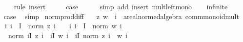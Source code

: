 \begin{isabellebody}
\ \ \ \ \isamarkupfalse%
\ {\isacharparenleft}{\kern0pt}rule\ insert{\isacharparenright}{\kern0pt}\isanewline
\ \ \isamarkupfalse%
\ \isamarkupfalse%
\ {\isacharquery}{\kern0pt}case\isanewline
\ \ \ \ \isamarkupfalse%
\ {\isacharparenleft}{\kern0pt}simp\ add{\isacharcolon}{\kern0pt}\ insert\ mult{\isacharunderscore}{\kern0pt}left{\isacharunderscore}{\kern0pt}mono{\isacharparenright}{\kern0pt}\isanewline
{}\isamarkupfalse%
\isanewline
\ \ \isamarkupfalse%
\ infinite\isanewline
\ \ \isamarkupfalse%
\ \isamarkupfalse%
\ {\isacharquery}{\kern0pt}case\ \isamarkupfalse%
\ simp\isanewline
{}\isamarkupfalse%
%
\endisatagproof
{\isafoldproof}%
%
\isadelimproof
\isanewline
%
\endisadelimproof
\isanewline
{}\isamarkupfalse%
\ norm{\isacharunderscore}{\kern0pt}prod{\isacharunderscore}{\kern0pt}diff{\isacharcolon}{\kern0pt}\isanewline
\ \ \ z\ w\ {\isacharcolon}{\kern0pt}{\isacharcolon}{\kern0pt}\ {\isachardoublequoteopen}{\isacharprime}{\kern0pt}i\ {\isasymRightarrow}\ {\isacharprime}{\kern0pt}a{\isacharcolon}{\kern0pt}{\isacharcolon}{\kern0pt}{\isacharbraceleft}{\kern0pt}real{\isacharunderscore}{\kern0pt}normed{\isacharunderscore}{\kern0pt}algebra{\isacharunderscore}{\kern0pt}{}{\isacharcomma}{\kern0pt}\ comm{\isacharunderscore}{\kern0pt}monoid{\isacharunderscore}{\kern0pt}mult{\isacharbraceright}{\kern0pt}{\isachardoublequoteclose}\isanewline
\ \ \ {\isachardoublequoteopen}{\isacharparenleft}{\kern0pt}{\isasymAnd}i{\isachardot}{\kern0pt}\ i\ {\isasymin}\ I\ {\isasymLongrightarrow}\ norm\ {\isacharparenleft}{\kern0pt}z\ i{\isacharparenright}{\kern0pt}\ {\isasymle}\ {}{\isacharparenright}{\kern0pt}\ {\isasymLongrightarrow}\ {\isacharparenleft}{\kern0pt}{\isasymAnd}i{\isachardot}{\kern0pt}\ i\ {\isasymin}\ I\ {\isasymLongrightarrow}\ norm\ {\isacharparenleft}{\kern0pt}w\ i{\isacharparenright}{\kern0pt}\ {\isasymle}\ {}{\isacharparenright}{\kern0pt}\ {\isasymLongrightarrow}\isanewline
\ \ \ \ norm\ {\isacharparenleft}{\kern0pt}{\isacharparenleft}{\kern0pt}{\isasymProd}i{\isasymin}I{\isachardot}{\kern0pt}\ z\ i{\isacharparenright}{\kern0pt}\ {\isacharminus}{\kern0pt}\ {\isacharparenleft}{\kern0pt}{\isasymProd}i{\isasymin}I{\isachardot}{\kern0pt}\ w\ i{\isacharparenright}{\kern0pt}{\isacharparenright}{\kern0pt}\ {\isasymle}\ {\isacharparenleft}{\kern0pt}{\isasymSum}i{\isasymin}I{\isachardot}{\kern0pt}\ norm\ {\isacharparenleft}{\kern0pt}z\ i\ {\isacharminus}{\kern0pt}\ w\ i{\isacharparenright}{\kern0pt}{\isacharparenright}{\kern0pt}{\isachardoublequoteclose}\isanewline

\end{isabellebody}
